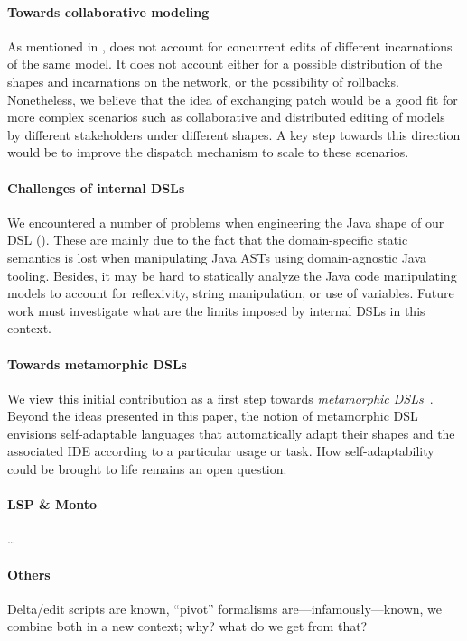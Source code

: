\paragraph{Towards collaborative modeling}
As mentioned in , \prism does not account for concurrent edits of different incarnations of the same model.
It does not account either for a possible distribution of the shapes and incarnations on the network, or the possibility of rollbacks.
Nonetheless, we believe that the idea of exchanging patch would be a good fit for more complex scenarios such as collaborative and distributed editing of models by different stakeholders under different shapes.
A key step towards this direction would be to improve the dispatch mechanism to scale to these scenarios.

\paragraph{Challenges of internal DSLs}
We encountered a number of problems when engineering the Java shape of our DSL ().
These are mainly due to the fact that the domain-specific static semantics is lost when manipulating Java ASTs using domain-agnostic Java tooling.
Besides, it may be hard to statically analyze the Java code manipulating models to account for reflexivity, string manipulation, or use of variables.
Future work must investigate what are the limits imposed by internal DSLs in this context.


\paragraph{Towards metamorphic DSLs}
We view this initial contribution as a first step towards \emph{metamorphic DSLs}~\cite{acher2014metamorphic}.
Beyond the ideas presented in this paper, the notion of metamorphic DSL envisions self-adaptable languages that automatically adapt their shapes and the associated IDE according to a particular usage or task.
How self-adaptability could be brought to life remains an open question.

\paragraph{LSP \& Monto}
\dots

\paragraph{Others}
Delta/edit scripts are known, ``pivot'' formalisms are---infamously---known, we combine both in a new context; why? what do we get from that?
